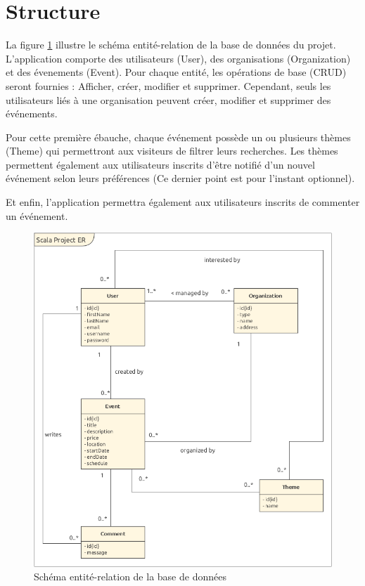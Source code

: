 \documentclass[11pt, a4paper, french, twoside]{article}
\begin{document}
	\section{Structure}
	\label{sec:structure}
		La figure \ref{fig:er} illustre le schéma entité-relation de la base de données du projet. L'application comporte des utilisateurs (User), des organisations (Organization) et des évenements (Event). Pour chaque entité, les opérations de base (CRUD) seront fournies : Afficher, créer, modifier et supprimer. Cependant, seuls les utilisateurs liés à une organisation peuvent créer, modifier et supprimer des événements.
		
		Pour cette première ébauche, chaque événement possède un ou plusieurs thèmes (Theme) qui permettront aux visiteurs de filtrer leurs recherches. Les thèmes permettent également aux utilisateurs inscrits d'être notifié d'un nouvel événement selon leurs préférences (Ce dernier point est pour l'instant optionnel).
		
		Et enfin, l'application permettra également aux utilisateurs inscrits de commenter un événement.
		
		\begin{figure}[h]
			\centering
			\includegraphics[width=0.8\linewidth]{images/project_ER.png}
			\caption{Schéma entité-relation de la base de données}
			\label{fig:er}
		\end{figure}
	
\end{document}
